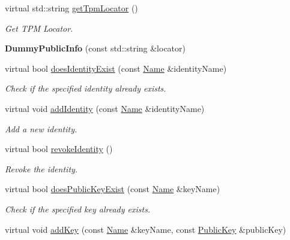 \begin{DoxyCompactItemize}
virtual std\+::string \hyperlink{classndn_1_1security_1_1DummyPublicInfo_acf6a99da5f69ef1aa6507e633e47ceab}{get\+Tpm\+Locator} ()
\begin{DoxyCompactList}\small\item\em Get T\+PM Locator. \end{DoxyCompactList}\item 
{\bfseries Dummy\+Public\+Info} (const std\+::string \&locator)\hypertarget{classndn_1_1security_1_1DummyPublicInfo_a6c2bb286d17aecb49f7ba707d4465b01}{}\label{classndn_1_1security_1_1DummyPublicInfo_a6c2bb286d17aecb49f7ba707d4465b01}

\item 
virtual bool \hyperlink{classndn_1_1security_1_1DummyPublicInfo_a0a528fd496478b3b1f8d1f9d053b96e0}{does\+Identity\+Exist} (const \hyperlink{classndn_1_1Name}{Name} \&identity\+Name)
\begin{DoxyCompactList}\small\item\em Check if the specified identity already exists. \end{DoxyCompactList}\item 
virtual void \hyperlink{classndn_1_1security_1_1DummyPublicInfo_a9d824e833f39314e262bb1fba2c2c3cd}{add\+Identity} (const \hyperlink{classndn_1_1Name}{Name} \&identity\+Name)
\begin{DoxyCompactList}\small\item\em Add a new identity. \end{DoxyCompactList}\item 
virtual bool \hyperlink{classndn_1_1security_1_1DummyPublicInfo_a862f51ad07b358d7e1c29ee30a727239}{revoke\+Identity} ()
\begin{DoxyCompactList}\small\item\em Revoke the identity. \end{DoxyCompactList}\item 
virtual bool \hyperlink{classndn_1_1security_1_1DummyPublicInfo_aaca6f1355663f7fb4a220f4b4824617e}{does\+Public\+Key\+Exist} (const \hyperlink{classndn_1_1Name}{Name} \&key\+Name)
\begin{DoxyCompactList}\small\item\em Check if the specified key already exists. \end{DoxyCompactList}\item 
virtual void \hyperlink{classndn_1_1security_1_1DummyPublicInfo_a61839747bc01d4cbad85221a8a15c2ff}{add\+Key} (const \hyperlink{classndn_1_1Name}{Name} \&key\+Name, const \hyperlink{classndn_1_1PublicKey}{Public\+Key} \&public\+Key)

\end{DoxyCompactItemize}
